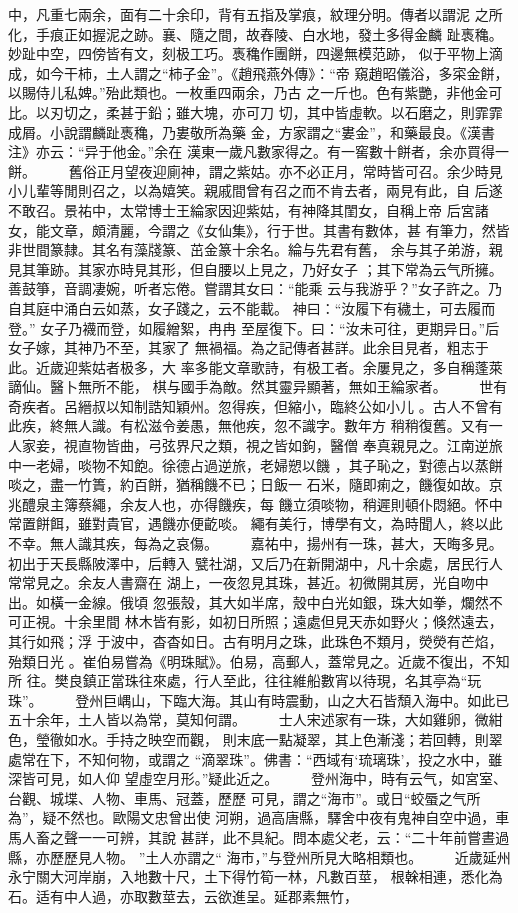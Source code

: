 \documentclass{ctexart}
\begin{document}
中，凡重七兩余，面有二十余印，背有五指及掌痕，紋理分明。傳者以謂泥 之所化，手痕正如握泥之跡。襄、隨之間，故舂陵、白水地，發土多得金麟 趾褭穐。妙趾中空，四傍皆有文，刻极工巧。褭穐作團餅，四邊無模范跡， 似于平物上滴成，如今干柿，土人謂之``柿子金''。《趙飛燕外傳》：``帝 窺趙昭儀浴，多寀金餅，以賜侍儿私婢。''殆此類也。一枚重四兩余，乃古 之一斤也。色有紫艷，非他金可比。以刃切之，柔甚于鉛；雖大塊，亦可刀 切，其中皆虛軟。以石磨之，則霏霏成屑。小說謂麟趾褭穐，乃婁敬所為藥 金，方家謂之``婁金''，和藥最良。《漢書注》亦云：``异于他金。''余在 漢東一歲凡數家得之。有一窖數十餅者，余亦買得一餅。 　　舊俗正月望夜迎廁神，謂之紫姑。亦不必正月，常時皆可召。余少時見 小儿輩等閒則召之，以為嬉笑。親戚間曾有召之而不肯去者，兩見有此，自 后遂不敢召。景祐中，太常博士王綸家因迎紫姑，有神降其閨女，自稱上帝 后宮諸女，能文章，頗清麗，今謂之《女仙集》，行于世。其書有數体，甚 有筆力，然皆非世間篆隸。其名有藻牋篆、茁金篆十余名。綸与先君有舊， 余与其子弟游，親見其筆跡。其家亦時見其形，但自腰以上見之，乃好女子 ；其下常為云气所擁。善鼓箏，音調凄婉，听者忘倦。嘗謂其女曰：``能乘 云与我游乎？''女子許之。乃自其庭中涌白云如蒸，女子踐之，云不能載。 神曰：``汝履下有穢土，可去履而登。'' 女子乃襪而登，如履繒絮，冉冉 至屋復下。曰：``汝未可往，更期异日。''后女子嫁，其神乃不至，其家了 無禍福。為之記傳者甚詳。此余目見者，粗志于此。近歲迎紫姑者极多，大 率多能文章歌詩，有极工者。余屢見之，多自稱蓬萊謫仙。醫卜無所不能， 棋与國手為敵。然其靈异顯著，無如王綸家者。 　　世有奇疾者。呂縉叔以知制誥知穎州。忽得疾，但縮小，臨終公如小儿 。古人不曾有此疾，終無人識。有松滋令姜愚，無他疾，忽不識字。數年方 稍稍復舊。又有一人家妾，視直物皆曲，弓弦界尺之類，視之皆如鉤，醫僧 奉真親見之。江南逆旅中一老婦，啖物不知飽。徐德占過逆旅，老婦愬以饑 ，其子恥之，對德占以蒸餅啖之，盡一竹簣，約百餅，猶稱饑不已；日飯一 石米，隨即痢之，饑復如故。京兆醴泉主簿蔡繩，余友人也，亦得饑疾，每 饑立須啖物，稍遲則頓仆悶絕。怀中常置餅餌，雖對貴官，遇饑亦便齕啖。 繩有美行，博學有文，為時聞人，終以此不幸。無人識其疾，每為之哀傷。 　　嘉祐中，揚州有一珠，甚大，天晦多見。初出于天長縣陂澤中，后轉入 甓社湖，又后乃在新開湖中，凡十余處，居民行人常常見之。余友人書齋在 湖上，一夜忽見其珠，甚近。初微開其房，光自吻中出。如橫一金線。俄頃 忽張殼，其大如半席，殼中白光如銀，珠大如拳，爛然不可正視。十余里間 林木皆有影，如初日所照；遠處但見天赤如野火；倏然遠去，其行如飛；浮 于波中，杳杳如日。古有明月之珠，此珠色不類月，熒熒有芒焰，殆類日光 。崔伯易嘗為《明珠賦》。伯易，高郵人，蓋常見之。近歲不復出，不知所 往。樊良鎮正當珠往來處，行人至此，往往維船數宵以待現，名其亭為``玩 珠''。 　　登州巨嵎山，下臨大海。其山有時震動，山之大石皆頹入海中。如此已 五十余年，土人皆以為常，莫知何謂。 　　士人宋述家有一珠，大如雞卵，微紺色，瑩徹如水。手持之映空而觀， 則末底一點凝翠，其上色漸淺；若回轉，則翠處常在下，不知何物，或謂之 ``滴翠珠''。佛書：``西域有`琉璃珠'，投之水中，雖深皆可見，如人仰 望虛空月形。''疑此近之。 　　登州海中，時有云气，如宮室、台觀、城堞、人物、車馬、冠蓋，歷歷 可見，謂之``海市''。或日``蛟蜃之气所為''，疑不然也。歐陽文忠曾出使 河朔，過高唐縣，驛舍中夜有鬼神自空中過，車馬人畜之聲一一可辨，其說 甚詳，此不具紀。問本處父老，云：``二十年前嘗晝過縣，亦歷歷見人物。 ''土人亦謂之`` 海市，''与登州所見大略相類也。 　　近歲延州永宁關大河岸崩，入地數十尺，土下得竹筍一林，凡數百莖， 根榦相連，悉化為石。适有中人過，亦取數莖去，云欲進呈。延郡素無竹， 
\end{document}

